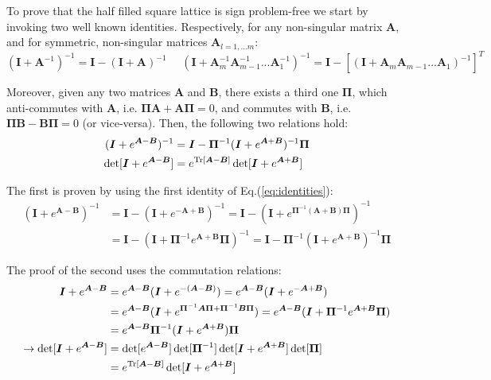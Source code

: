 To prove that the half filled square lattice is sign problem-free we start by invoking two well known identities.
Respectively, for any non-singular matrix $\bm A$, and for symmetric, non-singular matrices $\bm A_{l=1,... m}$:
\begin{equation}\label{eq:identities}
( \bm I + \bm A^{-1} )^{-1}  = \bm I - ( \bm I + \bm A )^{-1} \,\,\,\, \,\,\,\, ( \bm I + \bm A_m^{-1}  \bm A_{m-1}^{-1}  ...  \bm A_{1}^{-1} )^{-1} =  \bm I - [ ( \bm I + \bm A_m \bm A_{m-1} ... \bm A_1 )^{-1} ]^T
\end{equation}

Moreover, given any two matrices $\bm A$ and $\bm B$, there exists a third one $\bm \Pi$, which anti-commutes with $\bm A$, i.e. $ \bm \Pi \bm A  + \bm A \bm \Pi = 0$, and commutes with $\bm B$, i.e. $ \bm \Pi \bm B  - \bm B \bm \Pi = 0$ (or vice-versa).
Then, the following two relations hold:
\begin{equation}
\begin{split}
( \bm I + e^{\bm A - \bm B} )^{-1} &= \bm I - \bm \Pi^{-1} ( \bm I + e^{\bm A + \bm B} )^{-1} \bm \Pi \\
\det [ \bm I + e^{\bm A - \bm B} ] &= e^{\operatorname{Tr} [\bm A - \bm B ]} \det [ \bm I + e^{\bm A + \bm B} ]
\end{split}
\end{equation}

The first is proven by using the first identity of Eq.(\ref{eq:identities}):
\begin{equation}
\begin{split}
( \bm I + e^{\bm A - \bm B} )^{-1} &= \bm I - ( \bm I + e^{-\bm A + \bm B} )^{-1}  = \bm I - ( \bm I + e^{\bm \Pi^{-1} ( \bm A + \bm B) \bm \Pi } )^{-1} \\
&= \bm I - ( \bm I + \bm \Pi^{-1} e^{\bm A + \bm B} \bm \Pi )^{-1} = \bm I - \bm \Pi^{-1} ( \bm I + e^{\bm A + \bm B} )^{-1} \bm \Pi
\end{split}
\end{equation}

The proof of the second uses the commutation relations:
\begin{equation}
\begin{split}
\bm I + e^{\bm A - \bm B} &= e^{\bm A - \bm B} ( \bm I + e^{-(\bm A - \bm B)} ) = e^{\bm A - \bm B} ( \bm I + e^{-\bm A + \bm B} ) \\
&=e^{\bm A - \bm B} ( \bm I + e^{\bm \Pi^{-1} \bm A \bm \Pi +\bm \Pi^{-1} \bm B \bm \Pi  } ) = e^{\bm A - \bm B} ( \bm I + \bm \Pi^{-1} e^{\bm A + \bm B} \bm \Pi ) \\
&= e^{\bm A - \bm B}  \bm \Pi^{-1} ( \bm I + e^{\bm A + \bm B} ) \bm \Pi \\
\rightarrow \det [ \bm I + e^{\bm A - \bm B} ]&= \det [ e^{\bm A - \bm B} ] \det [ \bm \Pi^{-1} ] \det [ \bm I + e^{\bm A + \bm B} ] \det [ \bm \Pi ] \\
&= e^{ \operatorname{Tr} [ \bm A - \bm B ] } \det [ \bm I + e^{\bm A + \bm B} ]
\end{split}
\end{equation}

